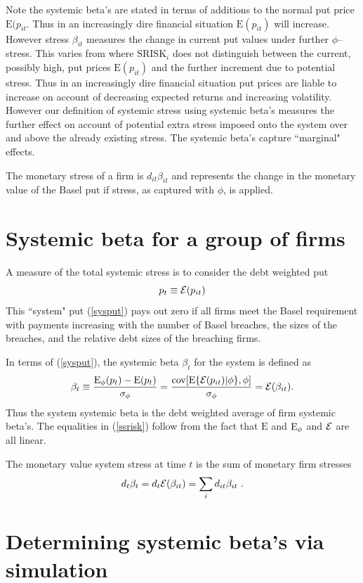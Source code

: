 \documentclass[authoryear]{elsarticle}
\newcommand{\E}{\mathrm{E}}
\newcommand{\cov}{\mathrm{cov}}
\newcommand{\Ex}{{\cal E}}
\newcommand{\eref}[1]{(\ref{#1})}
\newcommand{\be}[1]{\begin{equation}\label{#1}}
\newcommand{\ee}{\end{equation}}
\begin{document}
Note the systemic beta's are stated in terms of additions to the normal put price $\E(p_{it}$. Thus in an increasingly dire financial situation $\E(p_{it})$ will increase.   However stress $\beta_{it}$ measures the  change in current put values  under  further $\phi$--stress.  This varies from  \cite{brownlees2015} where $\mathrm{SRISK}_i$ does not distinguish between the current, possibly high, put prices $\E(p_{it})$ and the further increment due to potential stress.   Thus in an increasingly dire financial situation put prices are liable to increase on account of decreasing expected returns and increasing volatility.   However our definition of systemic stress using systemic beta's measures the further effect on account of potential extra stress imposed onto the system over and above the already existing stress.   The systemic beta's capture   ``marginal" effects.        

The  monetary stress of a firm is 
$
d_{it}\beta_{it}
$
and represents the change in the monetary value of the Basel put  if stress, as captured with $\phi$, is applied. 





\section{Systemic beta for a group of firms}

A measure of the total systemic stress is to consider the debt weighted put 
\be{sysput}
p_t\equiv\Ex(p_{it})
\ee
This ``system" put \eref{sysput} pays out zero if all firms meet the Basel requirement with payments increasing with the number of Basel breaches, the sizes of the breaches, and the relative debt sizes of the breaching firms.  

In terms of \eref{sysput}, the  systemic beta $\beta_t$ for the system is defined as
\be{ssrisk}
 \beta_t\equiv\frac{\Es(p_{t}) -\E(p_{t})}{\sigma_\phi} = \frac{\cov[\E\{\Ex(p_{it})|\phi\},\phi]}{\sigma_\phi}=\Ex(\beta_{it}) .
\ee
Thus the system systemic beta is the debt weighted average of firm systemic beta's.  The equalities in \eref{ssrisk} follow from the fact that  $\E$ and $\Es$ and $\Ex$ are all linear.

The monetary value  system stress at time $t$ is the sum of monetary firm stresses
$$
d_t\beta_t = d_t\Ex(\beta_{it}) = \sum_i d_{it}\beta_{it}\ . 
$$


\section{Determining systemic beta's via simulation}
\end{document}
